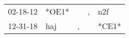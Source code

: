 \begin{supertabular}{lllll}
 02-18-12 &  *OE1* &    &  , &    n2f \\
 12-31-18 &    haj &  , &    &  *CE1* \\
\end{supertabular}
